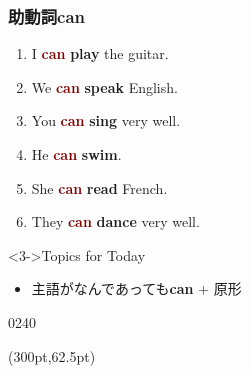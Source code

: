 \documentclass[aspectratio=169,xcolor={dvipsnames,table}]{beamer}
\newcommand{\myaudio}[1]{\href{#1}{\faVolumeUp}}
\begin{document}
\begin{frame}[plain]\frametitle{助動詞can}

\begin{enumerate}
 \item I \textcolor{Maroon}{\bfseries can} {\bfseries play} the guitar.
 \item We \textcolor{Maroon}{\bfseries can} {\bfseries speak} English.
 \item You \textcolor{Maroon}{\bfseries can} {\bfseries sing} very well.
 \item He \textcolor{Maroon}{\bfseries can} {\bfseries swim}.
 \item She \textcolor{Maroon}{\bfseries can} {\bfseries read} French.
 \item They \textcolor{Maroon}{\bfseries can} {\bfseries dance} very well.
\end{enumerate}

\vfill

\begin{block}<3->{Topics for Today}
\begin{itemize}[square]\small
 \item<3->   主語がなんであっても\textbf{can} $+$ 原形\\
 \end{itemize}
\end{block}

\vspace*{-10pt}

\hfill{\tiny 0240}\,{\scriptsize \myaudio{./audio/012_can_02.mp3}}

\begin{textblock*}{0.4\linewidth}(300pt,62.5pt)
\end{textblock*}
\end{frame}
\end{document}
